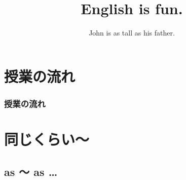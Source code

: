\documentclass[aspectratio=169,xcolor={dvipsnames,table}]{beamer}
\title{English is fun.}
\subtitle{John is as tall as his father.}
\author{}
\institute[]{}
\date[]
\begin{document}
\begin{frame}[plain]
  \titlepage
\end{frame}

\section*{授業の流れ}
\begin{frame}[plain]
  \frametitle{授業の流れ}
  \tableofcontents
\end{frame}

\section{同じくらい～}
\subsection{as ～ as \ldots{}}
\end{document}
